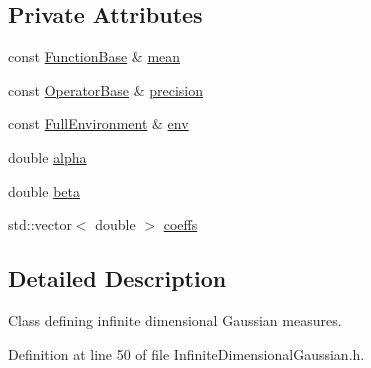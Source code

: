 \subsection*{Private Attributes}
\begin{DoxyCompactItemize}
\item 
const \hyperlink{class_q_u_e_s_o_1_1_function_base}{Function\-Base} \& \hyperlink{class_q_u_e_s_o_1_1_infinite_dimensional_gaussian_a9d12c4e80eca7d797381c734d6d3476e}{mean}
\item 
const \hyperlink{class_q_u_e_s_o_1_1_operator_base}{Operator\-Base} \& \hyperlink{class_q_u_e_s_o_1_1_infinite_dimensional_gaussian_af08c847ce01c948b60f72be309c60b37}{precision}
\item 
const \hyperlink{class_q_u_e_s_o_1_1_full_environment}{Full\-Environment} \& \hyperlink{class_q_u_e_s_o_1_1_infinite_dimensional_gaussian_a16bf46c24315506ddca4739b05579b92}{env}
\item 
double \hyperlink{class_q_u_e_s_o_1_1_infinite_dimensional_gaussian_ab3d6cf41482750591ccd8bbe2426a98d}{alpha}
\item 
double \hyperlink{class_q_u_e_s_o_1_1_infinite_dimensional_gaussian_a36618403cf2767efbde981a43b900a91}{beta}
\item 
std\-::vector$<$ double $>$ \hyperlink{class_q_u_e_s_o_1_1_infinite_dimensional_gaussian_abf9b3d144b4804414f328fa3ccca924a}{coeffs}
\end{DoxyCompactItemize}


\subsection{Detailed Description}
Class defining infinite dimensional Gaussian measures. 

Definition at line 50 of file Infinite\-Dimensional\-Gaussian.\-h.



